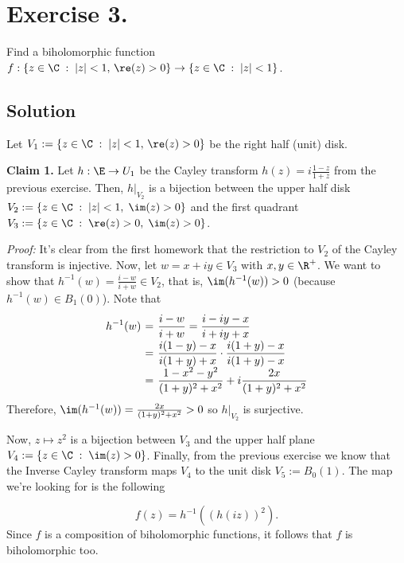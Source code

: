 
\section{Exercise 3.}

Find a biholomorphic function $f : \{z \in \C \;:\; |z| < 1,\,\re(z) > 0\} \to \{z\in \C \;:\; |z| < 1\}$.

\subsection*{Solution}

Let $V_1 := \{z \in \C \;:\; |z| < 1,\,\re(z) > 0\}$ be the right half (unit) disk.

\textbf{Claim 1.} Let $h: \E \to U_1$ be the Cayley transform $h(z) = i \frac{1-z}{1+z}$ from the previous exercise. Then, $h|_{V_2}$ is a bijection between the upper half disk $V_2 := \{z \in \C \;:\; |z| < 1,\;\im(z) > 0\}$ and the first quadrant $ V_3 := \{z \in \C \;:\; \re(z)>0,\; \im(z)>0\}$.

\textit{Proof:} It's clear from the first homework that the restriction to $V_2$ of the Cayley transform is injective. Now, let $w = x+iy \in V_3$ with $x,y \in \R^+$. We want to show that $h^{-1}(w) = \frac{i-w}{i+w} \in V_2$, that is, $\im(h^{-1}(w)) > 0$ (because $h^{-1}(w) \in B_1(0)$). Note that
\[ \everymath{\displaystyle}
\arraycolsep=1.8pt\def\arraystretch{1.8}
\begin{array}{rcl}
    h^{-1}(w) & = & \frac{i-w}{i+w} = \frac{i-iy-x}{i+iy+x}\\
    & = & \frac{i(1-y)-x}{i(1+y)+x} \cdot \frac{i(1+y)-x}{i(1+y)-x}\\
    & = & \frac{1-x^2-y^2}{(1+y)^2+x^2} + i \frac{2x}{(1+y)^2+x^2}
\end{array} \]
Therefore, $\im(h^{-1}(w)) = \frac{2x}{(1+y)^2+x^2} > 0$ so $h|_{V_2}$ is surjective.

Now, $z\mapsto z^2$ is a bijection between $V_3$ and the upper half plane $V_4 := \{z\in\C \;:\; \im(z) > 0\}$. Finally, from the previous exercise we know that the Inverse Cayley transform maps $V_4$ to the unit disk $V_5 := B_0(1)$. The map we're looking for is the following

\begin{center}
\end{center}
\[ f(z) = h^{-1}\left( (h(iz))^2  \right). \]
Since $f$ is a composition of biholomorphic functions, it follows that $f$ is biholomorphic too.